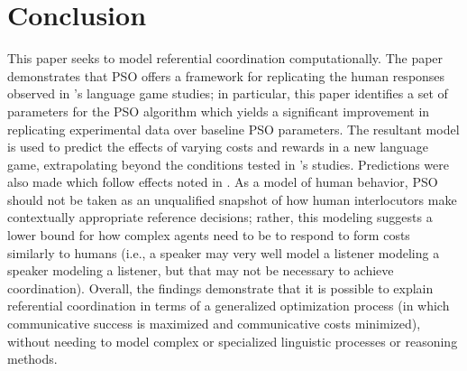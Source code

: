 \documentclass[a4paper,11pt]{article}
\begin{document}
\section{Conclusion}
This paper seeks to model referential coordination computationally. The paper demonstrates that PSO offers a framework for replicating the human responses observed in \citeauthor{rohde2012}'s \citeyear{rohde2012} language game studies; in particular, this paper identifies a set of parameters for the PSO algorithm which yields a significant improvement in replicating experimental data over baseline PSO parameters. The resultant model is used to predict the effects of varying costs and rewards in a new language game, extrapolating beyond the conditions tested in \citeauthor{rohde2012}'s studies. Predictions were also made which follow effects noted in \citeauthor{brennan1996}. As a model of human behavior, PSO should not be taken as an unqualified snapshot of how human interlocutors make contextually appropriate reference decisions; rather, this modeling suggests a lower bound for how complex agents need to be to respond to form costs similarly to humans (i.e., a speaker may very well model a listener modeling a speaker modeling a listener, but that may not be necessary to achieve coordination). Overall, the findings demonstrate that it is possible to explain referential coordination in terms of a generalized optimization process (in which communicative success is maximized and communicative costs minimized), without needing to model complex or specialized linguistic processes or reasoning methods.







\end{document}
